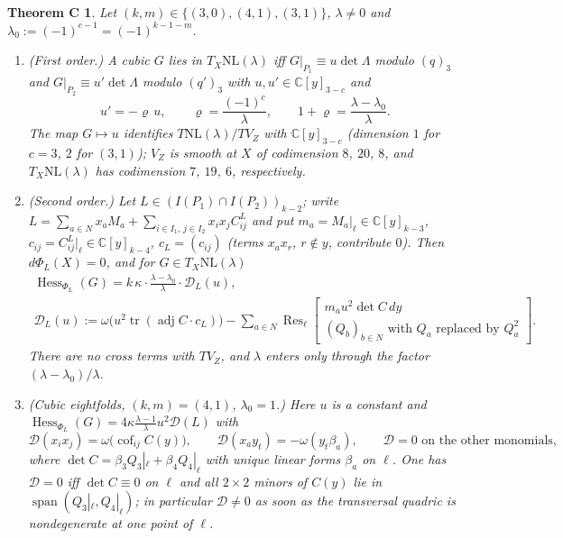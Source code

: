 \documentclass[10pt]{article}
\numberwithin{equation}{section}
\newtheorem*{thmC}{Theorem C}
\theoremstyle{remark}
\newcommand{\CC}{\mathbb{C}}
\newcommand{\NL}{\mathrm{NL}}
\newcommand{\VZ}{V_Z}
\newcommand{\cD}{\mathcal{D}}
\newcommand{\Res}{\operatorname{Res}}
\newcommand{\Hess}{\operatorname{Hess}}
\newcommand{\adj}{\operatorname{adj}}
\newcommand{\tr}{\operatorname{tr}}
\newcommand{\lres}[2]{\Res_\ell\!\begin{bmatrix} #1 \\ #2 \end{bmatrix}}
\begin{document}
\begin{thmC}
Let $(k,m)\in\{(3,0),(4,1),(3,1)\}$, $\lambda\ne0$ and $\lambda_0:=(-1)^{c-1}=(-1)^{k-1-m}$.
\begin{enumerate}[label=\textup{(\arabic*)}]
\item \textup{(First order.)} A cubic $G$ lies in $T_X\NL(\lambda)$ iff $G|_{P_1}\equiv u\det\Lambda$ modulo
$(q)_3$ and $G|_{P_2}\equiv u'\det\Lambda$ modulo $(q')_3$ with $u,u'\in\CC[y]_{3-c}$ and
\begin{equation}\label{eq:Cu}
u'=-\varrho\,u,\qquad\varrho=\frac{(-1)^c}{\lambda},\qquad 1+\varrho=\frac{\lambda-\lambda_0}{\lambda}.
\end{equation}
The map $G\mapsto u$ identifies $T\NL(\lambda)/T\VZ$ with $\CC[y]_{3-c}$ \textup{(}dimension $1$ for $c=3$,
$2$ for $(3,1)$\textup{)}; $\VZ$ is smooth at $X$ of codimension $8$, $20$, $8$, and $T_X\NL(\lambda)$ has
codimension $7$, $19$, $6$, respectively.
\item \textup{(Second order.)} Let $L\in(I(P_1)\cap I(P_2))_{k-2}$; write
$L=\sum_{a\in N}x_aM_a+\sum_{i\in I_1,\,j\in I_2}x_ix_jC^L_{ij}$ and put $m_a=M_a|_\ell\in\CC[y]_{k-3}$,
$c_{ij}=C^L_{ij}|_\ell\in\CC[y]_{k-4}$, $c_L=(c_{ij})$ \textup{(}terms $x_ax_r$, $r\notin y$, contribute
$0$\textup{)}. Then $d\Phi_L(X)=0$, and for $G\in T_X\NL(\lambda)$
\begin{equation}\label{eq:CD}
\begin{gathered}
\Hess_{\Phi_L}(G)=k\,\kappa\cdot\frac{\lambda-\lambda_0}{\lambda}\cdot\cD_L(u),\\
\cD_L(u):=\omega\bigl(u^2\tr(\adj C\cdot c_L)\bigr)-\sum_{a\in N}\lres{m_a u^2\det C\,dy}{(Q_b)_{b\in N}\text{ with }Q_a\text{ replaced by }Q_a^2}.
\end{gathered}
\end{equation}
There are no cross terms with $T\VZ$, and $\lambda$ enters only through the factor
$(\lambda-\lambda_0)/\lambda$.
\item \textup{(Cubic eightfolds, $(k,m)=(4,1)$, $\lambda_0=1$.)} Here $u$ is a constant and
$\Hess_{\Phi_L}(G)=4\kappa\frac{\lambda-1}{\lambda}u^2\cD(L)$ with
\[
\cD(x_ix_j)=\omega\bigl(\operatorname{cof}_{ij}C(y)\bigr),\qquad \cD(x_ay_t)=-\omega(y_t\beta_a),\qquad
\cD=0\text{ on the other monomials},
\]
where $\det C=\beta_3Q_3|_\ell+\beta_4Q_4|_\ell$ with unique linear forms $\beta_a$ on $\ell$. One has $\cD=0$
iff $\det C\equiv0$ on $\ell$ and all $2\times2$ minors of $C(y)$ lie in $\operatorname{span}(Q_3|_\ell,
Q_4|_\ell)$; in particular $\cD\ne0$ as soon as the transversal quadric is nondegenerate at one point of $\ell$.

\end{enumerate}
\end{thmC}
\end{document}
